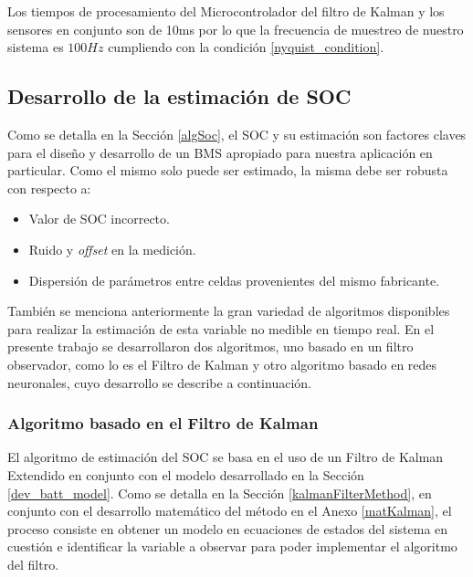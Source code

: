 \documentclass[10pt,a4paper]{article}
\newcounter{subsubsubsection}[subsubsection]
\begin{document}
Los tiempos de procesamiento del Microcontrolador del filtro de Kalman y los
sensores en conjunto son de 10ms por lo que la frecuencia de muestreo de nuestro
sistema es $100 Hz$ cumpliendo con la condición \ref{nyquist_condition}.

\subsection{Desarrollo de la estimaci\'on de \acrshort{SOC}}

Como se detalla en la Secci\'on \ref{algSoc}, el \acrshort{SOC} y su
estimaci\'on son factores claves para el diseño y desarrollo de un
\acrshort{BMS} apropiado para nuestra aplicaci\'on en particular. Como el mismo
solo puede ser estimado, la misma debe ser robusta con respecto a:

\begin{itemize}
    \item Valor de \acrshort{SOC} incorrecto.
    \item Ruido y \emph{offset} en la medici\'on.
    \item Dispersi\'on de par\'ametros entre celdas provenientes del mismo
        fabricante.
\end{itemize}

Tambi\'en se menciona anteriormente la gran variedad de algoritmos disponibles
para realizar la estimaci\'on de esta variable no medible en tiempo real. En el
presente trabajo se desarrollaron dos algoritmos, uno basado en un filtro
observador, como lo es el Filtro de Kalman y otro algoritmo basado en redes
neuronales, cuyo desarrollo se describe a continuaci\'on.

\subsubsection{Algoritmo basado en el Filtro de Kalman}

El algoritmo de estimaci\'on del \acrshort{SOC} se basa en el uso 
de un Filtro de Kalman Extendido en conjunto con el modelo desarrollado en la 
Secci\'on \ref{dev_batt_model}. Como se detalla en la Secci\'on
\ref{kalmanFilterMethod}, en conjunto con el desarrollo matem\'atico del
m\'etodo en el Anexo \ref{matKalman}, el proceso consiste en obtener un modelo
en ecuaciones de estados del sistema en cuesti\'on e identificar la variable a 
observar para poder implementar el algoritmo del filtro.

\end{document}
